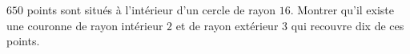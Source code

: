 $650$ points sont situés à l'intérieur d'un cercle de rayon $16$. Montrer qu'il existe une couronne de rayon intérieur $2$ et de rayon extérieur $3$ qui recouvre dix de ces points.
